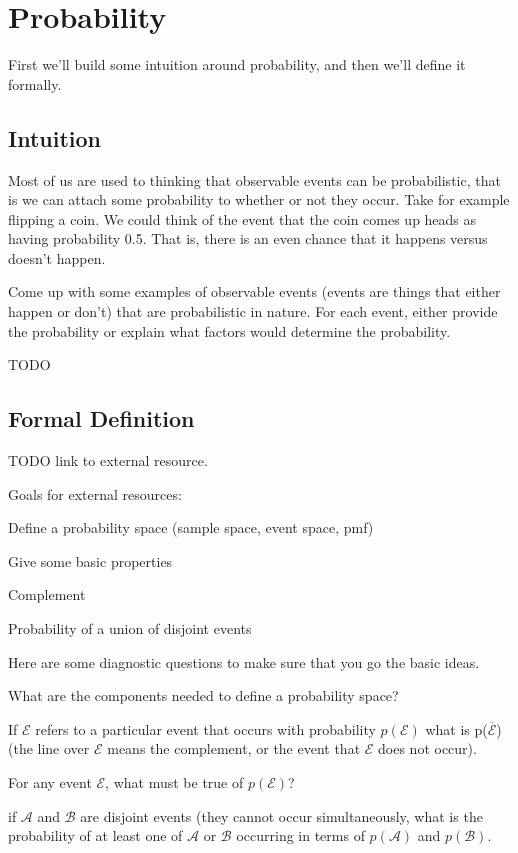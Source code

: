 \documentclass[assignment01_Solutions]{subfiles}
\begin{document}
\section{Probability}
First we'll build some intuition around probability, and then we'll define it formally.

\subsection{Intuition}
Most of us are used to thinking that observable events can be probabilistic, that is we can attach some probability to whether or not they occur.  Take for example flipping a coin.  We could think of the event that the coin comes up heads as having probability 0.5.  That is, there is an even chance that it happens versus doesn’t happen.
\begin{exercise}
Come up with some examples of observable events (events are things that either happen or don’t) that are probabilistic in nature.  For each event, either provide the probability or explain what factors would determine the probability.

\begin{boxedsolution}
TODO
\end{boxedsolution}

\end{exercise}

\subsection{Formal Definition}

TODO link to external resource.
\begin{externalresources}
\bi
\item Goals for external resources:
\item Define a probability space (sample space, event space, pmf)
\item Give some basic properties
\item Complement
\item Probability of a union of disjoint events
\ei

\end{externalresources}

\begin{exercise}
Here are some diagnostic questions to make sure that you go the basic ideas.
\bes
\item What are the components needed to define a probability space?
\item If $\mathcal{E}$ refers to a particular event that occurs with probability $p(\mathcal{E})$ what is p($\overline{\mathcal{E}}$) (the line over $\mathcal{E}$ means the complement, or the event that $\mathcal{E}$ does not occur).
\item For any event $\mathcal{E}$, what must be true of $p(\mathcal{E})$?
\item if $\mathcal{A}$ and $\mathcal{B}$ are disjoint events (they cannot occur simultaneously, what is the probability of at least one of $\mathcal{A}$ or $\mathcal{B}$ occurring in terms of $p(\mathcal{A})$ and $p(\mathcal{B})$.
\ees
\end{exercise}
\end{document}
